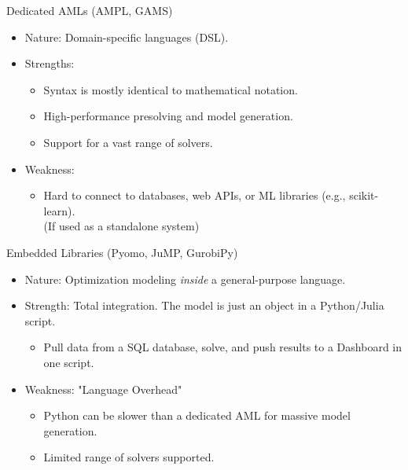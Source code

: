 \documentclass[presentation, aspectratio=169]{beamer}
\begin{document}
\begin{frame}[label={sec:orge3628b7}]{}
\begin{block}{Dedicated AMLs (AMPL, GAMS)}
\begin{itemize}
\item \alert{\alert{Nature}}: Domain-specific languages (DSL).
\item \alert{\alert{Strengths}}:
\begin{itemize}
\item Syntax is mostly identical to mathematical notation.
\item High-performance presolving and model generation.
\item Support for a vast range of solvers.
\end{itemize}
\item \alert{\alert{Weakness}}:
\begin{itemize}
\item Hard to connect to databases, web APIs, or ML libraries (e.g., scikit-learn).\\
(If used as a standalone system)
\end{itemize}
\end{itemize}
\end{block}

\begin{block}{Embedded Libraries (Pyomo, JuMP, GurobiPy)}
\begin{itemize}
\item \alert{\alert{Nature}}: Optimization modeling \emph{inside} a general-purpose language.
\item \alert{\alert{Strength}}: Total integration. The model is just an object in a Python/Julia script.
\begin{itemize}
\item Pull data from a SQL database, solve, and push results to a Dashboard in one script.
\end{itemize}
\item \alert{\alert{Weakness}}: "Language Overhead"
\begin{itemize}
\item Python can be slower than a dedicated AML for massive model generation.
\item Limited range of solvers supported.
\end{itemize}
\end{itemize}
\end{block}
\end{frame}
\end{document}
